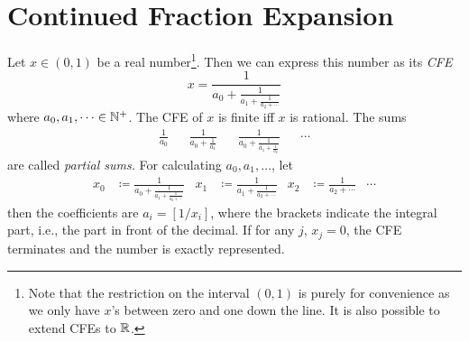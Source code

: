 	\section{Continued Fraction Expansion}
		Let \( x \in (0, 1) \) be a real number\footnote{Note that the restriction on the interval \( (0, 1) \) is purely for convenience as we only have \(x\)'s between zero and one down the line. It is also possible to extend \aclp{CFE} to \(\mathbb{R}\).}. Then we can express this number as its \emph{\ac{CFE}}
		\begin{equation}
			x = \frac{1}{a_0 + \frac{1}{a_1 + \frac{1}{a_2 + \cdots}}}
		\end{equation}
		where \( a_0, a_1, \dots \in \mathbb{N}^+ \). The \ac{CFE} of \(x\) is finite iff \(x\) is rational. The sums
		\begin{align}
			\frac{1}{a_0} &&
			\frac{1}{a_0 + \frac{1}{a_1}} &&
			\frac{1}{a_0 + \frac{1}{a_1 + \frac{1}{a_2}}} &&
			\cdots
		\end{align}
		are called \emph{partial sums.} For calculating \( a_0, a_1, \dots \), let
		\begin{align}
			x_0 &\coloneqq \frac{1}{a_0 + \frac{1}{a_1 + \frac{1}{a_2 + \cdots}}} &
			x_1 &\coloneqq \frac{1}{a_1 + \frac{1}{a_2 + \cdots}} &
			x_2 &\coloneqq \frac{1}{a_2 + \cdots} &
			\cdots
		\end{align}
		then the coefficients are \( a_i = [1 / x_i] \), where the brackets indicate the integral part, i.e., the part in front of the decimal. If for any \(j\), \(x_j = 0\), the \ac{CFE} terminates and the number is exactly represented.

